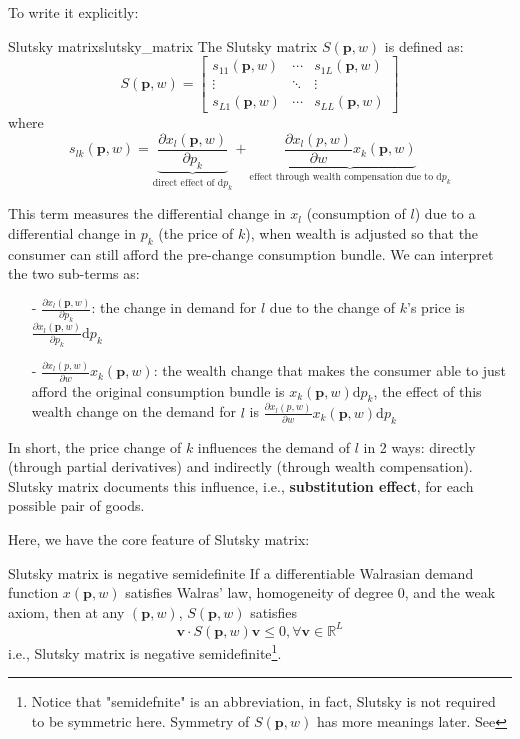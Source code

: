 To write it explicitly:
\begin{definition}{Slutsky matrix}{slutsky_matrix}
    The Slutsky matrix $S(\mathbf{p},w)$ is defined as:
    $$
S(\mathbf{p},w)=
\begin{bmatrix}
    s_{11}(\mathbf{p},w) & \cdots & s_{1L}(\mathbf{p},w)\\
    \vdots & \ddots & \vdots \\
    s_{L1}(\mathbf{p},w) & \cdots & s_{LL}(\mathbf{p},w)
\end{bmatrix}
$$
where $$s_{lk}(\mathbf{p},w)=\underbrace{\frac{\partial x_l(\mathbf{p},w)}{\partial p_k}}_{\text{direct effect of }\mathrm{d} p_k} +\underbrace{\frac{\partial x_l (p,w)}{\partial w}x_k(\mathbf{p},w)}_{\text{effect through wealth compensation due to }\mathrm{d} p_k}$$
\end{definition}

This term measures the differential change in $x_l$ (consumption of $l$) due to a differential change in $p_k$ (the price of $k$), when wealth is adjusted so that the consumer can still afford the pre-change consumption bundle. We can interpret the two sub-terms as:
\begin{enumerate}
    \item[-] $\frac{\partial x_l(\mathbf{p},w)}{\partial p_k}$: the change in demand for $l$ due to the change of $k$'s price is $\frac{\partial x_l(\mathbf{p},w)}{\partial p_k}\mathrm{d} p_k$
    \item[-] $\frac{\partial x_l (p,w)}{\partial w}x_k(\mathbf{p},w)$: the wealth change that makes the consumer able to just afford the original consumption bundle is $x_k(\mathbf{p},w)\mathrm{d} p_k$, the effect of this wealth change on the demand for $l$ is $\frac{\partial x_l (p,w)}{\partial w}x_k(\mathbf{p},w)\mathrm{d} p_k$
\end{enumerate}
In short, the price change of $k$ influences the demand of $l$ in 2 ways: directly (through partial derivatives) and indirectly (through wealth compensation). Slutsky matrix documents this influence, i.e., \textbf{substitution effect}, for each possible pair of goods. 

Here, we have the core feature of Slutsky matrix: 
\begin{theorem}{Slutsky matrix is negative semidefinite}{}
    If a differentiable Walrasian demand function $ x(\mathbf{p},w)$ satisfies Walras' law, homogeneity of degree 0, and the weak axiom, then at any $(\mathbf{p},w)$, $S(\mathbf{p},w)$ satisfies
    $$\mathbf{v}\cdot S(\mathbf{p},w)\mathbf{v}\leq 0, \forall \mathbf{v}\in\mathbb{R}^L$$
    i.e., Slutsky matrix is negative semidefinite\footnote{Notice that "semidefnite" is an abbreviation, in fact, Slutsky is not required to be symmetric here. Symmetry of $S(\mathbf{p},w)$ has more meanings later. See }.
\end{theorem}


